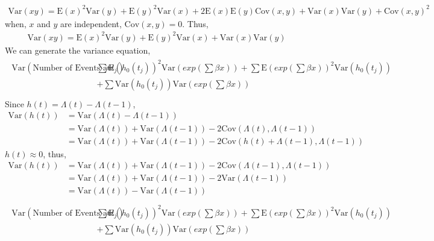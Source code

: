 \documentclass[12pt,letterpaper]{article}
\begin{document}
\begin{align*}
\mathrm{Var}(xy)=\mathrm{E}(x)^2\mathrm{Var}(y)+\mathrm{E}(y)^2\mathrm{Var}(x)+2\mathrm{E}(x)\mathrm{E}(y)\mathrm{Cov}(x,y)+\mathrm{Var}(x)\mathrm{Var}(y)+\mathrm{Cov}(x,y)^2 
\end{align*}
when, $x$ and $y$ are independent, $\mathrm{Cov}(x,y)=0$. Thus,
\begin{align*}
\mathrm{Var}(xy)=\mathrm{E}(x)^2\mathrm{Var}(y)+\mathrm{E}(y)^2\mathrm{Var}(x)+\mathrm{Var}(x)\mathrm{Var}(y)
\end{align*}
We can generate the variance equation,
\begin{align*}
\begin{split}
\mathrm{Var}(\text{Number of Events at } t_j) 
=&\sum{\mathrm{E}(h_0(t_j))^2\mathrm{Var}(exp(\sum{\beta x}))}+\sum{\mathrm{E}(exp(\sum{\beta x}))^2\mathrm{Var}(h_0(t_j))}\\
&+\sum{\mathrm{Var}(h_0(t_j))\mathrm{Var}(exp(\sum{\beta x}))}		\\
\end{split}
\end{align*}
Since $h(t)=\Lambda(t)-\Lambda(t-1)$, 
\begin{align*}
\mathrm{Var}(h(t))&=\mathrm{Var}(\Lambda(t)-\Lambda(t-1))\\
&=\mathrm{Var}(\Lambda(t))+\mathrm{Var}(\Lambda(t-1))-2\mathrm{Cov}(\Lambda(t),\Lambda(t-1))\\
&=\mathrm{Var}(\Lambda(t))+\mathrm{Var}(\Lambda(t-1))-2\mathrm{Cov}(h(t)+\Lambda(t-1),\Lambda(t-1))
\end{align*}
$h(t) \approx 0$, thus,
\begin{align*}
\mathrm{Var}(h(t))&=\mathrm{Var}(\Lambda(t))+\mathrm{Var}(\Lambda(t-1))-2\mathrm{Cov}(\Lambda(t-1),\Lambda(t-1))\\
&=\mathrm{Var}(\Lambda(t))+\mathrm{Var}(\Lambda(t-1))-2\mathrm{Var}(\Lambda(t-1))\\
&=\mathrm{Var}(\Lambda(t))-\mathrm{Var}(\Lambda(t-1))\\
\end{align*}
\begin{align*}
\begin{split}
\mathrm{Var}(\text{Number of Events at } t_j) 
=&\sum{\mathrm{E}(h_0(t_j))^2\mathrm{Var}(exp(\sum{\beta x}))}+\sum{\mathrm{E}(exp(\sum{\beta x}))^2\mathrm{Var}(h_0(t_j))}\\
&+\sum{\mathrm{Var}(h_0(t_j))\mathrm{Var}(exp(\sum{\beta x}))}		\\
\end{split}
\end{align*} 
\end{document}
